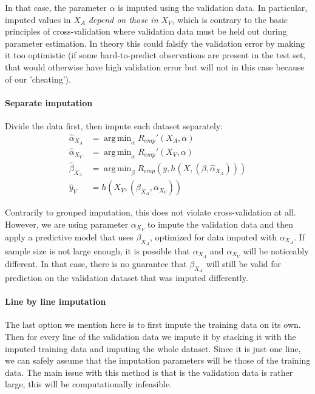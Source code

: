 \documentclass[12pt, a4paper]{memoir}
\DeclareMathOperator*{\argmin}{arg\,min}
\begin{document}
In that case, the parameter $\alpha$ is imputed using the validation data. In particular, imputed values in $X_A$ \emph{depend on those in $X_V$}, which is contrary to the basic principles of cross-validation where validation data must be held out during parameter estimation. In theory this could falsify the validation error by making it too optimistic (if some hard-to-predict observations are present in the test set, that would otherwise have high validation error but will not in this case because of our 'cheating').

\paragraph{Separate imputation}
Divide the data first, then impute each dataset separately:
\begin{align*}
\hat{\alpha}_{X_A} &= \argmin_{\alpha} R_{emp}'(X_A, \alpha) \\
\hat{\alpha}_{X_V} &= \argmin_{\alpha} R_{emp}'(X_V, \alpha) \\
\hat{\beta}_{X_A} &= \argmin_{\beta} R_{emp}(y, h(X, (\beta, \hat{\alpha}_{X_A}))) \\
\hat{y}_V &= h(X_V, (\beta_{X_A}, \alpha_{X_V}))
\end{align*}

Contrarily to grouped imputation, this does not violate cross-validation at all. However, we are using parameter $\alpha_{X_V}$ to impute the validation data and then apply a predictive model that uses $\beta_{X_A}$, optimized for data imputed with $\alpha_{X_A}$. If sample size is not large enough, it is possible that $\alpha_{X_A}$ and $\alpha_{X_V}$ will be noticeably different. In that case, there is no guarantee that $\beta_{X_A}$ will still be valid for prediction on the validation dataset that was imputed differently. 

\paragraph{Line by line imputation}
The last option we mention here is to first impute the training data on its own. Then for every line of the validation data we impute it by stacking it with the imputed training data and imputing the whole dataset. Since it is just one line, we can safely assume that the imputation parameters will be those of the training data. The main issue with this method is that is the validation data is rather large, this will be computationally infeasible.
\end{document}
